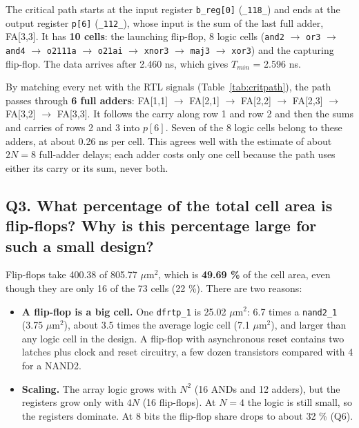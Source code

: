 \documentclass[10pt,a4paper,twocolumn]{article}
\newcommand{\umsq}{$\mu$m$^2$}
\newcommand{\cell}[1]{\texttt{#1}}
\begin{document}
The critical path starts at the input register \texttt{b\_reg[0]} (\texttt{\_118\_}) and ends at the output
register \texttt{p[6]} (\texttt{\_112\_}), whose input is the sum of the last full adder, FA[3,3]. It has
\textbf{10 cells}: the launching flip-flop, 8 logic cells (\cell{and2} $\rightarrow$ \cell{or3} $\rightarrow$
\cell{and4} $\rightarrow$ \cell{o2111a} $\rightarrow$ \cell{o21ai} $\rightarrow$ \cell{xnor3} $\rightarrow$
\cell{maj3} $\rightarrow$ \cell{xor3}) and the capturing flip-flop. The data arrives after 2.460 ns, which gives
$T_{min}$ = 2.596 ns.

By matching every net with the RTL signals (Table~\ref{tab:critpath}), the path passes through \textbf{6 full adders}:
FA[1,1] $\rightarrow$ FA[2,1] $\rightarrow$ FA[2,2] $\rightarrow$ FA[2,3] $\rightarrow$ FA[3,2] $\rightarrow$ FA[3,3].
It follows the carry along row 1 and row 2 and then the sums and carries of rows 2 and 3 into $p[6]$. Seven of
the 8 logic cells belong to these adders, at about 0.26 ns per cell. This agrees well with the estimate of about
$2N = 8$ full-adder delays; each adder costs only one cell because the path uses either its carry or its sum,
never both.

\subsection*{Q3. What percentage of the total cell area is flip-flops? Why is this percentage large for such a small design?}

Flip-flops take 400.38 of 805.77 \umsq, which is \textbf{49.69 \%} of the cell area, even though they are only
16 of the 73 cells (22 \%). There are two reasons:
\begin{itemize}[nosep]
  \item \textbf{A flip-flop is a big cell.} One \cell{dfrtp\_1} is 25.02 \umsq: 6.7 times a \cell{nand2\_1}
        (3.75 \umsq), about 3.5 times the average logic cell (7.1 \umsq), and larger than any logic cell in the
        design. A flip-flop with asynchronous reset contains two latches plus clock and reset circuitry, a few
        dozen transistors compared with 4 for a NAND2.
  \item \textbf{Scaling.} The array logic grows with $N^2$ (16 ANDs and 12 adders), but the registers grow only
        with $4N$ (16 flip-flops). At $N = 4$ the logic is still small, so the registers dominate. At 8 bits the
        flip-flop share drops to about 32 \% (Q6).
\end{itemize}
\end{document}
